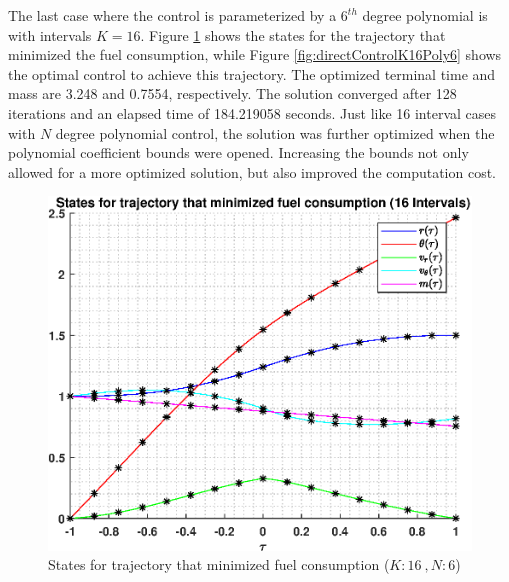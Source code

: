 \documentclass[]{article}
\begin{document}
\vspace{2mm}\newline 
The last case where the control is parameterized by a \(6^{th}\) degree polynomial is with intervals \(K = 16\). Figure \ref{fig:directStatesK16Poly6} shows the states for the trajectory that minimized the fuel consumption, while Figure \ref{fig:directControlK16Poly6} shows the optimal control to achieve this trajectory. The optimized terminal time and mass are 3.248 and 0.7554, respectively. The solution converged after 128 iterations and an elapsed time of  184.219058 seconds. Just like 16 interval cases with \(N\) degree polynomial control, the solution was further optimized when the polynomial coefficient bounds were opened. Increasing the bounds not only allowed for a more optimized solution, but also improved the computation cost. 
\begin{figure}
	\centering
	\includegraphics[scale=0.75]{directStatesK16Poly6.eps}
	\caption{States for trajectory that minimized fuel consumption (\(K:16\ , N:6\))}
	\label{fig:directStatesK16Poly6}
\end{figure}
\end{document}
